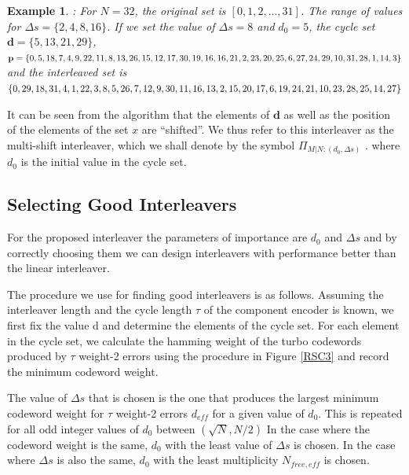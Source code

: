 \documentclass[technicalreport]{ieicej}
\newtheorem{example}[theorem]{Example}
\begin{document}
  \begin{example}
  \label{E2}
 : For $N=32$, the original set is $[0,1,2,...,31]$. The range of values for 
 $\Delta s = \{ 2,4,8,16\}$.  If we set the value
 of $\Delta s = 8$ and $d_0=5$, the cycle set 
  $\mathbf{d}=\{ 5,13,21,29\}$, \\
 $\mathbf{p}= \{ 0, 5, 18, 7, 4, 9, 22, 11, 8, 13, 26, 15, 12, 17, 30, 19, 16, 16, 21\\,
 2, 23, 20, 25, 6, 27, 24, 29, 10, 31, 28, 1, 14, 3\}$  and the interleaved set is 
  $\{0, 29, 18, 31, 4, 1, 22, 3, 8, 5, 26, 7, 12, 9, 30\\, 11, 16, 13, 2,
  15, 20, 17, 6, 19, 24, 21, 10, 23, 28,25, 14, 27\}$
 
 \end{example}
 
 It can be seen from the algorithm that the elements of $\mathbf{d}$ as well as the position of the 
 elements of the set $x$ are ``shifted''. We thus refer to this interleaver as the multi-shift 
 interleaver, which we shall denote by the symbol $\Pi_{\mathit{M}|{N:(d_0,\Delta s)}}$ .
 where $d_0$ is the initial value in the cycle set.

 \subsection{Selecting Good Interleavers}
 For the proposed interleaver the parameters of importance are $d_0$ and $\Delta s$ and
 by correctly choosing them we can design interleavers with performance better
 than the linear interleaver. 

 The procedure we use for finding good interleavers is as follows. Assuming
 the interleaver length and the cycle length $\tau$ of the component 
 encoder is known, we first fix the value d and determine the elements of the cycle set.
 For each element in the cycle set, we calculate the hamming weight of the 
 turbo codewords 
 produced by $\tau$ weight-2 errors
 using the procedure in Figure \ref{RSC3} and record the minimum codeword weight. 

 
 The value of 
 $\Delta s$ that is chosen is the one that produces the largest minimum codeword 
 weight for $\tau$ weight-2 errors $d_{eff}$
 for a given value of $d_0$. This is repeated for all odd integer values of $d_0$
  between $(\sqrt{N},N/2)$
  In the case where the codeword weight is the same, 
 $d_0$ with the least value of $\Delta s$ is chosen. In the case where $\Delta s$ is also
 the same, $d_0$ with the least multiplicity $N_{free,eff}$ is chosen.
   
\end{document}
